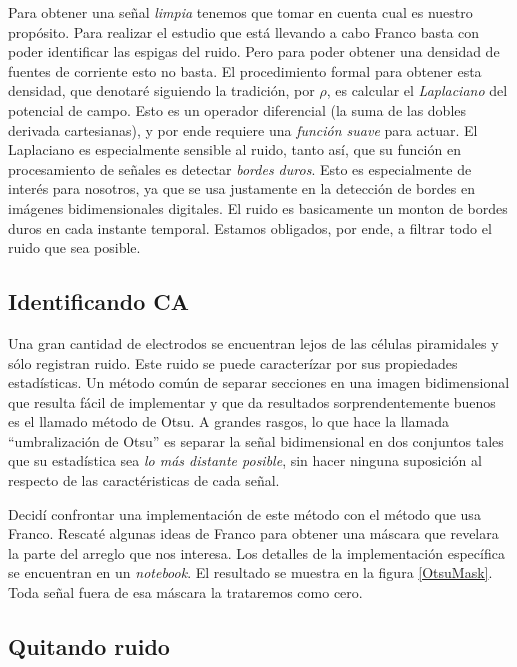 \documentclass{article}
\begin{document}
Para obtener una señal \emph{limpia} tenemos que tomar en cuenta
cual es nuestro propósito. Para realizar el estudio que está llevando a cabo
Franco basta con poder identificar las espigas del ruido.
Pero para poder obtener una densidad de fuentes de corriente esto no basta.
El procedimiento formal para obtener esta densidad, que denotaré siguiendo
la tradición, por $\rho$, es calcular el \emph{Laplaciano} del potencial de
campo. Esto es un operador diferencial (la suma de las dobles derivada 
cartesianas), y por ende requiere una \emph{función suave} para actuar. 
El Laplaciano es especialmente sensible al ruido, tanto así, que su
función en procesamiento de señales es detectar \emph{bordes duros}.
Esto es especialmente de interés para nosotros, ya que se usa
justamente en la detección de bordes en imágenes bidimensionales digitales.
El ruido es basicamente un monton de bordes duros en cada instante temporal.
Estamos obligados, por ende, a filtrar todo el ruido que sea posible.

\subsection{Identificando CA}

Una gran cantidad de electrodos se encuentran lejos de las células
piramidales y sólo registran ruido. Este ruido se puede caracterízar
por sus propiedades estadísticas. Un método común de separar secciones
en una imagen bidimensional que resulta fácil de implementar y que
da resultados sorprendentemente buenos es el llamado método de Otsu.
A grandes rasgos, lo que hace la llamada ``umbralización de Otsu'' es
separar la señal bidimensional en dos conjuntos tales que su 
estadística sea \emph{lo más distante posible}, sin hacer ninguna
suposición al respecto de las caractéristicas de cada señal.

Decidí confrontar una implementación de este método con
el método que usa Franco.
Rescaté algunas ideas de Franco para obtener una máscara que
revelara la parte del arreglo que nos interesa.
Los detalles de la implementación específica 
se encuentran en un \emph{notebook}. El resultado se muestra en la figura
\ref{OtsuMask}.  Toda señal fuera de esa máscara la trataremos como cero.


\subsection{Quitando ruido}
\end{document}
